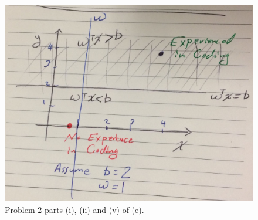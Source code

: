\documentclass[12pt]{article}
\begin{document}
\begin{figure}[H]
\centering
    \includegraphics[width=400 pt]{IMG_7313.jpg}
    \caption{Problem 2 parts (i), (ii) and (v) of (e).}
    \label{fig:Mat}
\end{figure}
\end{document}

